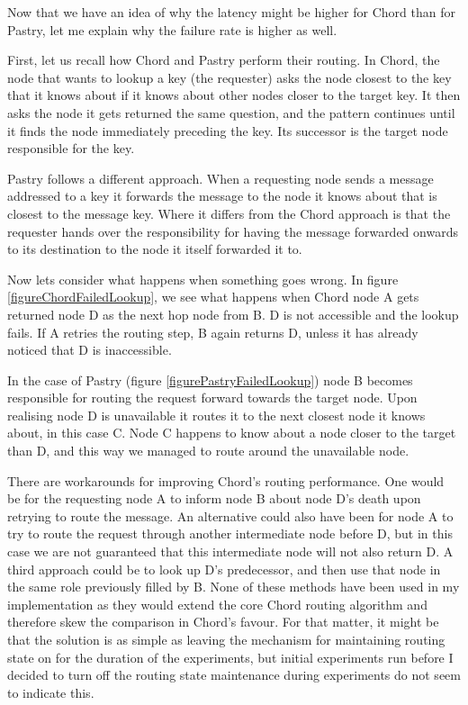 \mbox{}
Now that we have an idea of why the latency might be higher for Chord than for Pastry, let me explain why the failure rate is higher as well.

First, let us recall how Chord and Pastry perform their routing.
In Chord, the node that wants to lookup a key (the requester) asks the node closest to the key that it knows about if it knows about other nodes closer to the target key. It then asks the node it gets returned the same question, and the pattern continues until it finds the node immediately preceding the key. Its successor is the target node responsible for the key.

Pastry follows a different approach. When a requesting node sends a message addressed to a key it forwards the message to the node it knows about that is closest to the message key. Where it differs from the Chord approach is that the requester hands over the responsibility for having the message forwarded onwards to its destination to the node it itself forwarded it to.

Now lets consider what happens when something goes wrong.
In figure \ref{figureChordFailedLookup}, we see what happens when Chord node A gets returned node D as the next hop node from B. D is not accessible and the lookup fails. If A retries the routing step, B again returns D, unless it has already noticed that D is inaccessible.

In the case of Pastry (figure \ref{figurePastryFailedLookup}) node B becomes responsible for routing the request forward towards the target node. Upon realising node D is unavailable it routes it to the next closest node it knows about, in this case C. Node C happens to know about a node closer to the target than D, and this way we managed to route around the unavailable node.

There are workarounds for improving Chord's routing performance. One would be for the requesting node A to inform node B about node D's death upon retrying to route the message. An alternative could also have been for node A to try to route the request through another intermediate node before D, but in this case we are not guaranteed that this intermediate node will not also return D.
A third approach could be to look up D's predecessor, and then use that node in the same role previously filled by B. None of these methods have been used in my implementation as they would extend the core Chord routing algorithm and therefore skew the comparison in Chord's favour.
For that matter, it might be that the solution is as simple as leaving the mechanism for maintaining routing state on for the duration of the experiments, but initial experiments run before I decided to turn off the routing state maintenance during experiments do not seem to indicate this.

